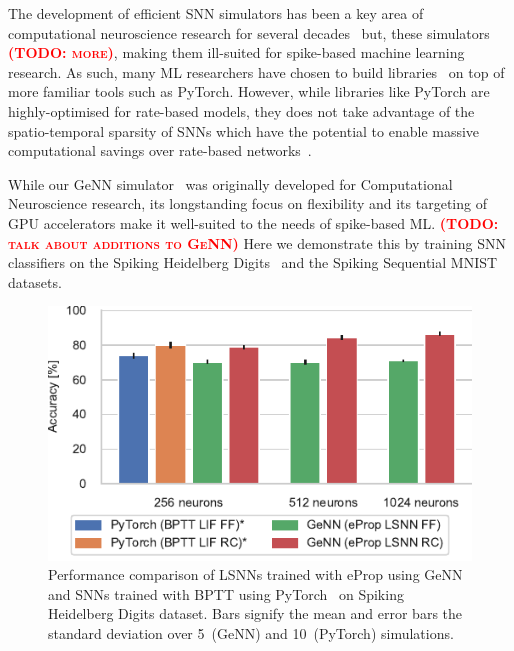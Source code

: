 \documentclass[sigconf,authordraft]{acmart}
\newcommand{\todo}[1]{\textbf{\textsc{\textcolor{red}{(TODO: #1)}}}}
\begin{document}
The development of efficient SNN simulators has been a key area of computational neuroscience research for several decades~\citep{carnevale2006neuron, Gewaltig2007, Golosio2021, Akar2019,Yavuz2016} but, these simulators \todo{more}, making them ill-suited for spike-based machine learning research.
As such, many ML researchers have chosen to build libraries~\citep{norse2021, SpikingJelly, eshraghian2021training,Hazan2018} on top of more familiar tools such as PyTorch.
However, while libraries like PyTorch are highly-optimised for rate-based models, they does not take advantage of the spatio-temporal sparsity of SNNs which have the potential to enable massive computational savings over rate-based networks~\citep{Yin2021}.

While our GeNN simulator~\citep{Yavuz2016,Knight2018,Knight2021} was originally developed for Computational Neuroscience research, its longstanding focus on flexibility and its targeting of GPU accelerators make it well-suited to the needs of spike-based ML.
\todo{talk about additions to GeNN}
Here we demonstrate this by training SNN classifiers on the Spiking Heidelberg Digits~\citep{Cramer2020} and the Spiking Sequential MNIST~\citep{Plank2021} datasets.

\begin{figure}[t]
  \centering
  \includegraphics{figures/shd_performance.pdf}
  \caption{Performance comparison of  LSNNs trained with eProp using GeNN and SNNs trained with BPTT using PyTorch~\citep{Zenke2021a} on Spiking Heidelberg Digits dataset.
  Bars signify the mean and error bars the standard deviation over 5~(GeNN) and 10~(PyTorch) simulations.}
  \label{fig:shd_performance}
\end{figure}
\end{document}
